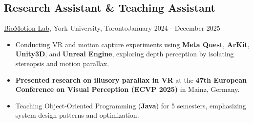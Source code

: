 \subsection{Research Assistant \& Teaching Assistant}{\href{https://www.yorku.ca/research/biomotionlab/}{BioMotion Lab}, York University, Toronto}{January 2024 - December 2025}
\begin{itemize}
    \item Conducting VR and motion capture experiments using \textbf{Meta Quest}, \textbf{ArKit}, \textbf{Unity3D}, and \textbf{Unreal Engine}, exploring depth perception by isolating stereopsis and motion parallax.
    \item \textbf{Presented research on illusory parallax in VR} at the \textbf{47th European Conference on Visual Perception (ECVP 2025)} in Mainz, Germany.
    \item Teaching Object-Oriented Programming (\textbf{Java}) for 5 semesters, emphasizing system design patterns and optimization.
\end{itemize}
